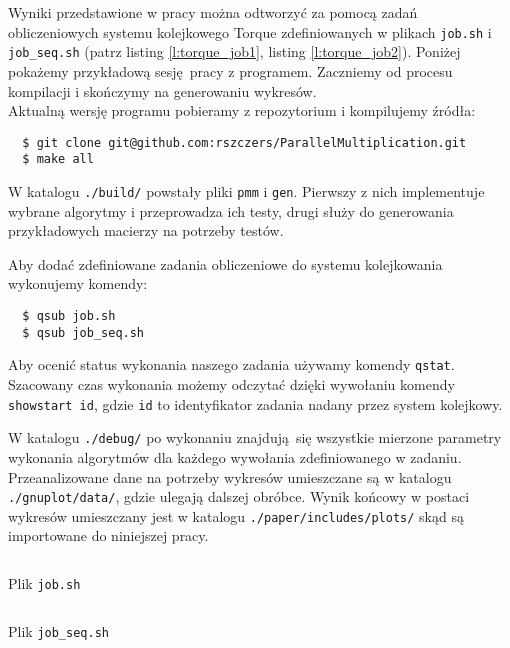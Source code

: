 Wyniki przedstawione w pracy można odtworzyć za pomocą zadań obliczeniowych systemu kolejkowego Torque zdefiniowanych w plikach \texttt{job.sh} i \texttt{job\_seq.sh} (patrz listing \ref{l:torque_job1}, listing \ref{l:torque_job2}). Poniżej pokażemy przykładową sesję pracy z programem. Zaczniemy od procesu kompilacji i skończymy na generowaniu wykresów.\\

Aktualną wersję programu pobieramy z repozytorium i kompilujemy źródła:
\begin{verbatim}
  $ git clone git@github.com:rszczers/ParallelMultiplication.git
  $ make all
\end{verbatim}

\noindent W katalogu \texttt{./build/} powstały pliki \texttt{pmm} i \texttt{gen}. Pierwszy z nich implementuje wybrane algorytmy i przeprowadza ich testy, drugi służy do generowania przykładowych macierzy na potrzeby testów.

Aby dodać zdefiniowane zadania obliczeniowe do systemu kolejkowania wykonujemy komendy:
\begin{verbatim}
  $ qsub job.sh
  $ qsub job_seq.sh
\end{verbatim}

Aby ocenić status wykonania naszego zadania używamy komendy \texttt{qstat}. Szacowany czas wykonania możemy odczytać dzięki wywołaniu komendy\\ \texttt{showstart id}, gdzie \texttt{id} to identyfikator zadania nadany przez system kolejkowy.


W katalogu \texttt{./debug/} po wykonaniu znajdują się wszystkie mierzone parametry wykonania algorytmów dla każdego wywołania zdefiniowanego w zadaniu. Przeanalizowane dane na potrzeby wykresów umieszczane są w katalogu \texttt{./gnuplot/data/}, gdzie ulegają dalszej obróbce. Wynik końcowy w postaci wykresów umieszczany jest w katalogu \texttt{./paper/includes/plots/} skąd są importowane do niniejszej pracy.

\begin{listing}[H]
\inputminted[fontsize=\footnotesize,bgcolor=bg]{bash}{includes/listings/job.sh}
\caption{Plik \texttt{job.sh}}
\label{l:torque_job1}
\end{listing}

\begin{listing}[H]
\footnotesize
\inputminted[fontsize=\footnotesize,bgcolor=bg]{bash}{includes/listings/job_seq.sh}
\caption{Plik \texttt{job\_seq.sh}}
\label{l:torque_job2}
\end{listing}



